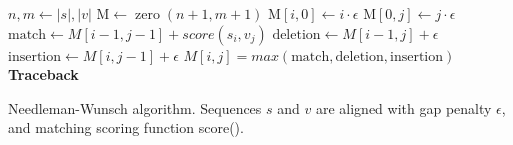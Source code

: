 \begin{algorithm}[!ht]
\begin{algorithmic}[1]
  \State $n, m \gets |s|, |v|$
  \State $\text{M} \gets \operatorname{zero}(n+1, m+1)$ 
   
    \State $\text{M}[i, 0] \gets i \cdot \epsilon$
  \EndFor
   
    \State $\text{M}[0, j] \gets j \cdot \epsilon$
  \EndFor
   
      \State $\text{match} \gets M[i-1, j-1] + score(s_i, v_j)$
      \State $\text{deletion} \gets M[i-1, j] + \epsilon$
      \State $\text{insertion} \gets M[i, j-1] + \epsilon$
      \State $M[i, j] = max(\text{match}, \text{deletion}, \text{insertion})$ 
    \EndFor
  \EndFor
\State \textbf{Traceback}
\EndFunction
\end{algorithmic}
\caption[Needleman-Wunsch Algorithm]{Needleman-Wunsch algorithm. Sequences $s$ and $v$ are aligned with gap penalty $\epsilon$, and matching scoring function score().}\label{alg:nw}
\end{algorithm}